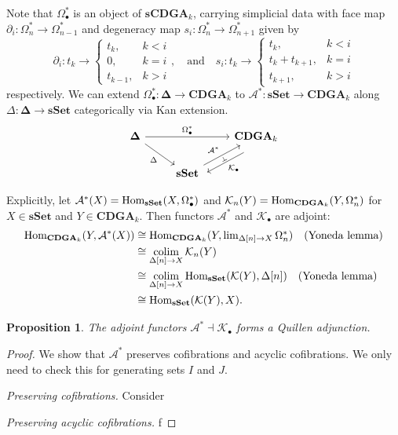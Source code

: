 \documentclass[psamsfonts]{amsart}
\newtheorem{prop}[thm]{Proposition}
\theoremstyle{definition}
\theoremstyle{remark}
\newcommand{\Hom}{\textup{Hom}}
\newcommand{\CDGA}{\mathbf{CDGA}}
\newcommand{\sSet}{\mathbf{sSet}}
\DeclareMathOperator*\colim{colim}
\numberwithin{equation}{section}
\begin{document}
Note that $\Omega_\bullet^\ast$ is an object of $\mathbf{sCDGA}_k$, carrying simplicial data with face map $\partial_i:\Omega_n^\ast\to\Omega_{n-1}^\ast$ and degeneracy map $s_i:\Omega_n^\ast\to\Omega_{n+1}^\ast$ given by
\[\partial_i:t_k\to\begin{cases}
t_k,&k<i\\0,&k=i\\t_{k-1},&k>i
\end{cases},\quad \textrm{and}\quad s_i:t_k\to\begin{cases}
t_k,&k<i\\t_k+t_{k+1},&k=i\\t_{k+1},&k>i
\end{cases}\]
respectively. We can extend $\Omega_\bullet^\ast:\mathbf{\Delta}\to\CDGA_k$ to $\mathcal{A}^\ast:\sSet\to\CDGA_k$ along $\Delta:\mathbf{\Delta}\to\sSet$ categorically via Kan extension.
\[\begin{tikzcd}
	{\mathbf{\Delta}} && {\textbf{CDGA}_k} \\
	& {\textbf{sSet}}
	\arrow["{\Omega_\bullet^\ast}", from=1-1, to=1-3]
	\arrow["\Delta"', from=1-1, to=2-2]
	\arrow[""{name=0, anchor=center, inner sep=0}, "{\mathcal{K}_\bullet}", shift left=3, from=1-3, to=2-2]
	\arrow[""{name=1, anchor=center, inner sep=0}, "{\mathcal{A}^\ast}" from=2-2, to=1-3]
	\arrow["\dashv"{anchor=center, rotate=299}, draw=none, from=0, to=1]
\end{tikzcd}\]

Explicitly, let $\mathcal{A}^\ast(X)=\Hom_{\sSet}(X,\Omega^\ast_\bullet)$ and $\mathcal{K}_n(Y)=\Hom_{\CDGA_k}(Y,\Omega_n^\ast)$ for $X\in\sSet$ and $Y\in\CDGA_k$. Then functors $\mathcal{A}^\ast$ and $\mathcal{K}_\bullet$ are adjoint:
\begin{align*}
\Hom_{\CDGA_k}(Y,\mathcal{A}^\ast(X))&\cong\Hom_{\CDGA_k}(Y,\textstyle{\lim_{\Delta[n]\to X}\Omega_n^\ast})\quad\textrm{(Yoneda lemma)}\\
&\cong\colim_{\Delta[n]\to X}\mathcal{K}_n(Y)\\
&\cong\colim_{\Delta[n]\to X}\Hom_{\sSet}(\mathcal{K}(Y),\Delta[n])\quad\textrm{(Yoneda lemma)}\\
&\cong\Hom_{\sSet}(\mathcal{K}(Y),X).
\end{align*}

\begin{prop}
The adjoint functors $\mathcal{A}^\ast\dashv\mathcal{K}_\bullet$ forms a Quillen adjunction.
\end{prop}
\begin{proof}
We show that $\mathcal{A}^\ast$ preserves cofibrations and acyclic cofibrations. We only need to check this for generating sets $I$ and $J$.\medbreak

\textit{Preserving cofibrations.} Consider\medbreak

\textit{Preserving acyclic cofibrations.} f
\end{proof}
\end{document}
